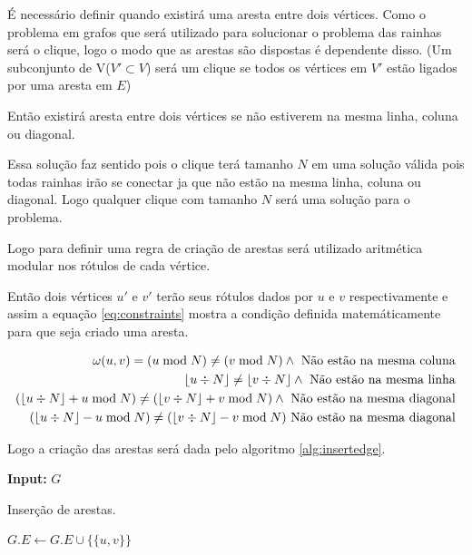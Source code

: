 \documentclass[11pt]{article}
\begin{document}
É necessário definir quando existirá uma aresta entre dois vértices. Como o problema em grafos que será utilizado para solucionar o problema das rainhas será o clique, logo o modo que as arestas são dispostas é dependente disso. (Um subconjunto de V(\(V'\subset V\)) será um clique se todos os vértices em \(V'\) estão ligados por uma aresta em \(E\))

Então existirá aresta entre dois vértices se não estiverem na mesma linha, coluna ou diagonal.

Essa solução faz sentido pois o clique terá tamanho \(N\) em uma solução válida pois todas rainhas irão se conectar ja que não estão na mesma linha, coluna ou diagonal. Logo qualquer clique com tamanho \(N\) será uma solução para o problema.

Logo para definir uma regra de criação de arestas será utilizado aritmética modular nos rótulos de cada vértice.

Então dois vértices \(u'\) e \(v'\) terão seus rótulos dados por \(u\) e \(v\) respectivamente e assim a equação \ref{eq:constraints} mostra a condição definida matemáticamente para que seja criado uma aresta.

\begin{equation}
\begin{aligned}
\omega(u,v) = (u\bmod N) \neq (v\bmod N) \land \text{ Não estão na mesma coluna}\\
\floor*{u\div N} \neq \floor*{v\div N} \land \text{ Não estão na mesma linha}\\
(\floor*{u\div N} + u\bmod N) \neq (\floor*{v\div N} + v\bmod N) \land \text{ Não estão na mesma diagonal}\\
(\floor*{u\div N} - u\bmod N) \neq (\floor*{v\div N} - v\bmod N) \text{ Não estão na mesma diagonal}\\
\end{aligned}
\end{equation}\label{eq:constraints}

Logo a criação das arestas será dada pelo algoritmo \ref{alg:insertedge}.

\begin{algorithm}
\textbf{Input:} $G$
\caption{Inserção de arestas.}\label{alg:insertedge}
\begin{algorithmic}[1]
\State $G.E \gets G.E \cup \{\{u,v\}\}$ 
\EndIf
\EndFor
\EndFor
\EndProcedure
\end{algorithmic}
\end{algorithm}
\end{document}
